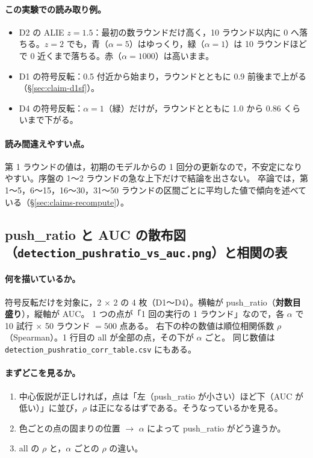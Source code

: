 \documentclass[a4j, dvipdfmx]{jsarticle}  %
\begin{document}
\paragraph{この実験での読み取り例。}
\begin{itemize}
  \item D2 の ALIE $z = 1.5$：最初の数ラウンドだけ高く，10 ラウンド以内に 0 へ落ちる。$z = 2$ でも，青（$\alpha = 5$）はゆっくり，緑（$\alpha = 1$）は 10 ラウンドほどで 0 近くまで落ちる。赤（$\alpha = 1000$）は高いまま。
  \item D1 の符号反転：0.5 付近から始まり，ラウンドとともに 0.9 前後まで上がる（\S\ref{sec:claim-d1sf}）。
  \item D4 の符号反転：$\alpha = 1$（緑）だけが，ラウンドとともに 1.0 から 0.86 くらいまで下がる。
\end{itemize}

\paragraph{読み間違えやすい点。}
第 1 ラウンドの値は，初期のモデルからの 1 回分の更新なので，不安定になりやすい。序盤の 1〜2 ラウンドの急な上下だけで結論を出さない。
卒論では，第 1〜5，6〜15，16〜30，31〜50 ラウンドの区間ごとに平均した値で傾向を述べている（\S\ref{sec:claims-recompute}）。

\subsection{push\_ratio と AUC の散布図（\texttt{detection\_pushratio\_vs\_auc.png}）と相関の表}

\paragraph{何を描いているか。}
符号反転だけを対象に，2 $\times$ 2 の 4 枚（D1〜D4）。横軸が push\_ratio（\textbf{対数目盛り}），縦軸が AUC。
1 つの点が「1 回の実行の 1 ラウンド」なので，各 $\alpha$ で 10 試行 $\times$ 50 ラウンド $= 500$ 点ある。
右下の枠の数値は順位相関係数 $\rho$（Spearman）。1 行目の all が全部の点，その下が $\alpha$ ごと。
同じ数値は \texttt{detection\_pushratio\_corr\_table.csv} にもある。

\paragraph{まずどこを見るか。}
\begin{enumerate}
  \item 中心仮説が正しければ，点は「左（push\_ratio が小さい）ほど下（AUC が低い）」に並び，$\rho$ は正になるはずである。そうなっているかを見る。
  \item 色ごとの点の固まりの位置 $\rightarrow$ $\alpha$ によって push\_ratio がどう違うか。
  \item all の $\rho$ と，$\alpha$ ごとの $\rho$ の違い。
\end{enumerate}
\end{document}
